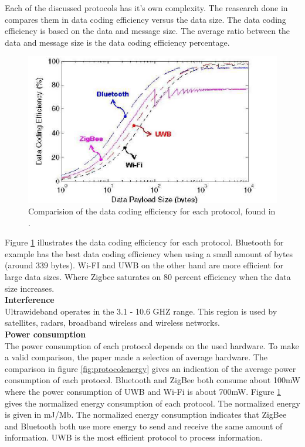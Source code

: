 \documentclass[10pt,a4paper]{article}
\begin{document}
Each of the discussed protocols has it's own complexity. The reasearch done in \cite{comparitivestudywirelessprotocols} compares them in data coding efficiency versus the data size. The data coding efficiency is based on the data and message size. The average ratio between the data and message size is the data coding efficiency percentage. 

\begin{figure}[H]
   \centering
   \includegraphics[width=1\textwidth]{datacodingefficieny}
   \caption{Comparision of the data coding efficiency for each protocol, found in \cite{comparitivestudywirelessprotocols}.}
   \label{fig:protocolefficiency}
\end{figure}

Figure \ref{fig:protocolefficiency} illustrates the data coding efficiency for each protocol. Bluetooth for example has the best data coding efficiency when using a small amount of bytes (around 339 bytes). Wi-FI and UWB on the other hand are more efficient for large data sizes. Where Zigbee saturates on 80 percent efficiency when the data size increases.\\


\textbf{Interference}\\
Ultrawideband operates in the 3.1 - 10.6 GHZ range. This region is used by satellites, radars, broadband wireless and wireless networks.\\



\textbf{Power consumption}\\
The power consumption of each protocol depends on the used hardware. To make a valid comparison, the paper \cite{comparitivestudywirelessprotocols} made a selection of average hardware. The comparison in figure \ref{fig:protocolenergy} gives an indication of the average power consumption of each protocol. Bluetooth and ZigBee both consume about 100mW where the power consumption of UWB and Wi-Fi is about 700mW. Figure \ref{fig:protocolefficiency} gives the normalized energy consumption of each protocol. The normalized energy is given in mJ/Mb. The normalized energy consumption indicates that ZigBee and Bluetooth both use more energy to send and receive the same amount of information. UWB is the most efficient protocol to process information.
\end{document}
